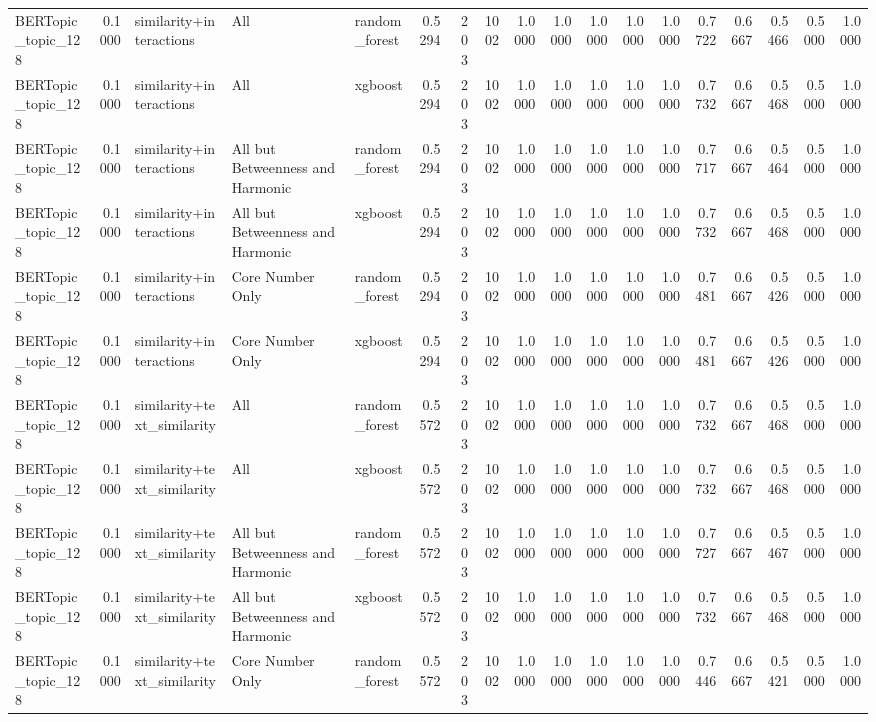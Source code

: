 \begin{tabular}{lrlllrrrrrrrrrrrrr}
BERTopic_topic_128 & 0.1000 & similarity+interactions & All & random_forest & 0.5294 & 203 & 1002 & 1.0000 & 1.0000 & 1.0000 & 1.0000 & 1.0000 & 0.7722 & 0.6667 & 0.5466 & 0.5000 & 1.0000 \\
BERTopic_topic_128 & 0.1000 & similarity+interactions & All & xgboost & 0.5294 & 203 & 1002 & 1.0000 & 1.0000 & 1.0000 & 1.0000 & 1.0000 & 0.7732 & 0.6667 & 0.5468 & 0.5000 & 1.0000 \\
BERTopic_topic_128 & 0.1000 & similarity+interactions & All but Betweenness and Harmonic & random_forest & 0.5294 & 203 & 1002 & 1.0000 & 1.0000 & 1.0000 & 1.0000 & 1.0000 & 0.7717 & 0.6667 & 0.5464 & 0.5000 & 1.0000 \\
BERTopic_topic_128 & 0.1000 & similarity+interactions & All but Betweenness and Harmonic & xgboost & 0.5294 & 203 & 1002 & 1.0000 & 1.0000 & 1.0000 & 1.0000 & 1.0000 & 0.7732 & 0.6667 & 0.5468 & 0.5000 & 1.0000 \\
BERTopic_topic_128 & 0.1000 & similarity+interactions & Core Number Only & random_forest & 0.5294 & 203 & 1002 & 1.0000 & 1.0000 & 1.0000 & 1.0000 & 1.0000 & 0.7481 & 0.6667 & 0.5426 & 0.5000 & 1.0000 \\
BERTopic_topic_128 & 0.1000 & similarity+interactions & Core Number Only & xgboost & 0.5294 & 203 & 1002 & 1.0000 & 1.0000 & 1.0000 & 1.0000 & 1.0000 & 0.7481 & 0.6667 & 0.5426 & 0.5000 & 1.0000 \\
BERTopic_topic_128 & 0.1000 & similarity+text_similarity & All & random_forest & 0.5572 & 203 & 1002 & 1.0000 & 1.0000 & 1.0000 & 1.0000 & 1.0000 & 0.7732 & 0.6667 & 0.5468 & 0.5000 & 1.0000 \\
BERTopic_topic_128 & 0.1000 & similarity+text_similarity & All & xgboost & 0.5572 & 203 & 1002 & 1.0000 & 1.0000 & 1.0000 & 1.0000 & 1.0000 & 0.7732 & 0.6667 & 0.5468 & 0.5000 & 1.0000 \\
BERTopic_topic_128 & 0.1000 & similarity+text_similarity & All but Betweenness and Harmonic & random_forest & 0.5572 & 203 & 1002 & 1.0000 & 1.0000 & 1.0000 & 1.0000 & 1.0000 & 0.7727 & 0.6667 & 0.5467 & 0.5000 & 1.0000 \\
BERTopic_topic_128 & 0.1000 & similarity+text_similarity & All but Betweenness and Harmonic & xgboost & 0.5572 & 203 & 1002 & 1.0000 & 1.0000 & 1.0000 & 1.0000 & 1.0000 & 0.7732 & 0.6667 & 0.5468 & 0.5000 & 1.0000 \\
BERTopic_topic_128 & 0.1000 & similarity+text_similarity & Core Number Only & random_forest & 0.5572 & 203 & 1002 & 1.0000 & 1.0000 & 1.0000 & 1.0000 & 1.0000 & 0.7446 & 0.6667 & 0.5421 & 0.5000 & 1.0000 \\

\end{tabular}
